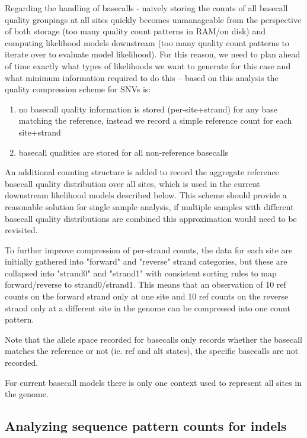 \documentclass{article}
\begin{document}
Regarding the handling of basecalls - naively storing  the counts of all basecall quality groupings at all sites quickly becomes unmanageable from the perspective of both storage (too many quality count patterns in RAM/on disk) and computing likelihood models downstream (too many quality count patterns to iterate over to evaluate model likelihood). For this reason, we need to plan ahead of time exactly what types of likelihoods we want to generate for this case and what minimum information required to do this -- based on this analysis the quality compression scheme for SNVs is:

\begin{enumerate}
\item no basecall quality information is stored (per-site+strand) for any base matching the reference, instead we record a simple reference count for each site+strand
\item basecall qualities are stored for all non-reference basecalls
\end{enumerate}

An additional counting structure is added to record the aggregate reference basecall quality distribution over all sites, which is used in the current downstream likelihood models described below. This scheme should provide a reasonable solution for single sample analysis, if multiple samples with different basecall quality distributions are combined this approximation would need to be revisited.

To further improve compression of per-strand counts, the data for each site are initially gathered into "forward" and "reverse" strand categories, but these are collapsed into "strand0" and "strand1" with consistent sorting rules to map forward/reverse to strand0/strand1. This means that an observation of 10 ref counts on the forward strand only at one site and 10 ref counts on the reverse strand only at a different site in the genome can be compressed into one count pattern.

Note that the allele space recorded for basecalls only records whether the basecall matches the reference or not (ie. ref and alt states), the specific basecalls are not recorded.

For current basecall models there is only one context used to represent all sites in the genome.

\subsection{Analyzing sequence pattern counts for indels}
\end{document}
